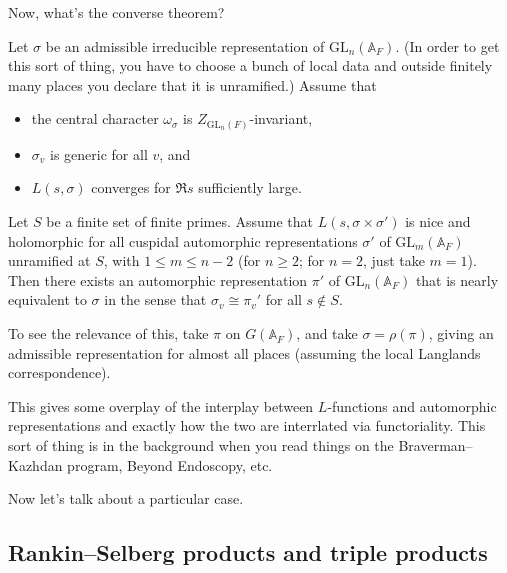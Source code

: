 \documentclass[reqno]{amsart} 
\begin{document}
Now, what's the converse theorem?
\begin{theorem}\label{theorem:cq6tho7vvs}
  Let $\sigma$ be an admissible irreducible representation of $\mathrm{GL}_n(\mathbb{A}_F)$.  (In order to get this sort of thing, you have to choose a bunch of local data and outside finitely many places you declare that it is unramified.)  Assume that
  \begin{itemize}
  \item the central character $\omega_\sigma$ is $Z_{\mathrm{GL}_n(F)}$-invariant,
  \item $\sigma_v$ is generic for all $v$, and
  \item $L(s, \sigma)$ converges for $\Re s$ sufficiently large.
  \end{itemize}
  Let $S$ be a finite set of finite primes.  Assume that $L(s, \sigma \times \sigma ')$ is nice and holomorphic for all cuspidal automorphic representations $\sigma '$ of $\mathrm{GL}_m(\mathbb{A}_F)$ unramified at $S$, with $1 \leq m \leq n - 2$ (for $n \geq 2$; for $n = 2$, just take $m = 1$).  Then there exists an automorphic representation $\pi '$ of $\mathrm{GL}_n(\mathbb{A}_F)$ that is nearly equivalent to $\sigma$ in the sense that $\sigma_v \cong \pi_v '$ for all $s \notin S$.
\end{theorem}
To see the relevance of this, take $\pi$ on $G(\mathbb{A}_F)$, and take $\sigma = \rho(\pi)$, giving an admissible representation for almost all places (assuming the local Langlands correspondence).

This gives some overplay of the interplay between $L$-functions and automorphic representations and exactly how the two are interrlated via functoriality.  This sort of thing is in the background when you read things on the Braverman--Kazhdan program, Beyond Endoscopy, etc.

Now let's talk about a particular case.

\subsection{Rankin--Selberg products and triple products}\label{sec:cq6tho1yti}
\end{document}
